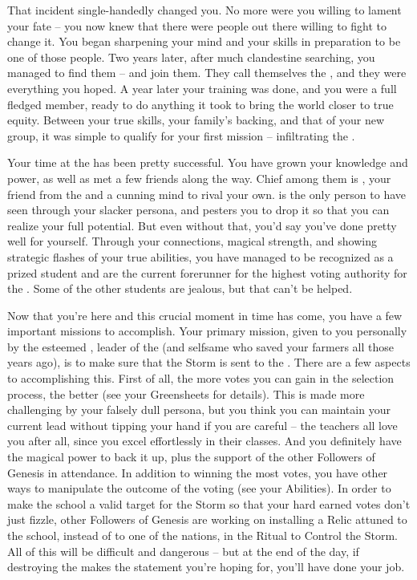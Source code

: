 \documentclass[char]{GL2020}
\begin{document}
That incident single-handedly changed you. No more were you willing to lament your fate -- you now knew that there were people out there willing to fight to change it. You began sharpening your mind and your skills in preparation to be one of those people. Two years later, after much clandestine searching, you managed to find them -- and join them. They call themselves the \pGoaties{}, and they were everything you hoped. A year later your training was done, and you were a full fledged member, ready to do anything it took to bring the world closer to true equity. Between your true skills, your family's backing, and that of your new group, it was simple to qualify for your first mission -- infiltrating the \pSchool{}.
 
Your time at the \pSc{} has been pretty successful. You have grown your knowledge and power, as well as met a few friends along the way. Chief among them is \cAmbition{\full}, your friend from the \pTech{} and a cunning mind to rival your own. \cAmbition{} is the only person to have seen through your slacker persona, and pesters you to drop it so that you can realize your full potential. But even without that, you'd say you've done pretty well for yourself. Through your connections, magical strength, and showing strategic flashes of your true abilities, you have managed to be recognized as a prized student and are the current forerunner for the highest voting authority for the \pFarm{}. Some of the other students are jealous, but that can't be helped.
 
Now that you're here and this crucial moment in time has come, you have a few important missions to accomplish. Your primary mission, given to you personally by the esteemed \cChupLeader{\full}, leader of the \pGoaties{} (and selfsame \cChupLeader{\person} who saved your farmers all those years ago), is to make sure that the Storm is sent to the \pSc{}. There are a few aspects to accomplishing this. First of all, the more votes you can gain in the selection process, the better (see your Greensheets for details). This is made more challenging by your falsely dull persona, but you think you can maintain your current lead without tipping your hand if you are careful – the teachers all love you after all, since you excel effortlessly in their classes. And you definitely have the magical power to back it up, plus the support of the other Followers of Genesis in attendance. In addition to winning the most votes, you have other ways to manipulate the outcome of the voting (see your Abilities). In order to make the school a valid target for the Storm so that your hard earned votes don't just fizzle, other Followers of Genesis are working on installing a Relic attuned to the school, instead of to one of the nations, in the Ritual to Control the Storm. All of this will be difficult and dangerous -- but at the end of the day, if destroying the \pSc{} makes the statement you're hoping for, you'll have done your job.
 
\end{document}
